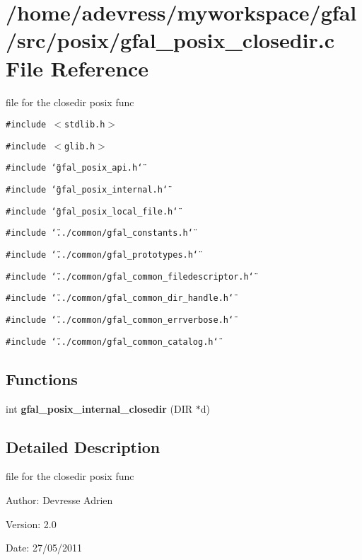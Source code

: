 \section{/home/adevress/myworkspace/gfal/src/posix/gfal\_\-posix\_\-closedir.c File Reference}
\label{gfal__posix__closedir_8c}
file for the closedir posix func 

{\tt \#include $<$stdlib.h$>$}\par
{\tt \#include $<$glib.h$>$}\par
{\tt \#include \char`\"{}gfal\_\-posix\_\-api.h\char`\"{}}\par
{\tt \#include \char`\"{}gfal\_\-posix\_\-internal.h\char`\"{}}\par
{\tt \#include \char`\"{}gfal\_\-posix\_\-local\_\-file.h\char`\"{}}\par
{\tt \#include \char`\"{}../common/gfal\_\-constants.h\char`\"{}}\par
{\tt \#include \char`\"{}../common/gfal\_\-prototypes.h\char`\"{}}\par
{\tt \#include \char`\"{}../common/gfal\_\-common\_\-filedescriptor.h\char`\"{}}\par
{\tt \#include \char`\"{}../common/gfal\_\-common\_\-dir\_\-handle.h\char`\"{}}\par
{\tt \#include \char`\"{}../common/gfal\_\-common\_\-errverbose.h\char`\"{}}\par
{\tt \#include \char`\"{}../common/gfal\_\-common\_\-catalog.h\char`\"{}}\par
\subsection*{Functions}
\begin{CompactItemize}
\item 
int \textbf{gfal\_\-posix\_\-internal\_\-closedir} (DIR $\ast$d)\label{gfal__posix__closedir_8c_3137761fa72f5cd168e84d82800a08be}

\end{CompactItemize}


\subsection{Detailed Description}
file for the closedir posix func 

\begin{Desc}
\item[Author:]Devresse Adrien \end{Desc}
\begin{Desc}
\item[Version:]2.0 \end{Desc}
\begin{Desc}
\item[Date:]27/05/2011 \end{Desc}
